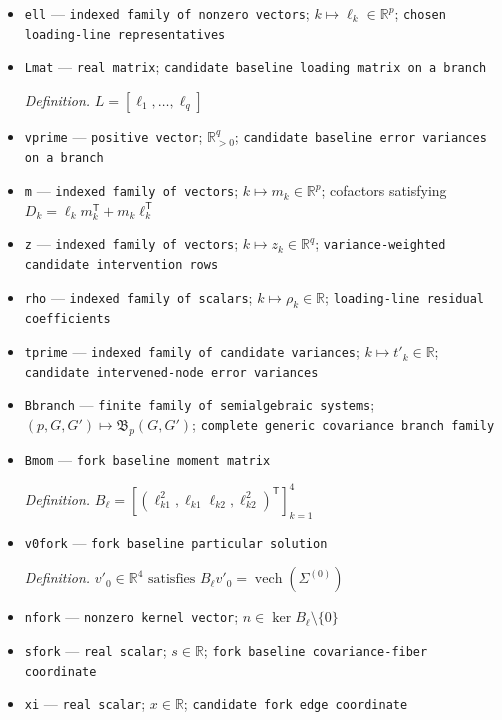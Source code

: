 \documentclass{article}
\begin{document}
\begin{itemize}
  \item \texttt{ell} --- \texttt{indexed family of nonzero vectors}; \(k\mapsto\ell_k\in\mathbb{R}^{p}\); \texttt{chosen loading-\allowbreak{}line representatives}
  \item \texttt{Lmat} --- \texttt{real matrix}; \texttt{candidate baseline loading matrix on a branch}
  \par\smallskip\noindent\emph{Definition.} \(L=[\ell_1,\ldots,\ell_q]\)
  \item \texttt{vprime} --- \texttt{positive vector}; \(\mathbb{R}_{>0}^{q}\); \texttt{candidate baseline error variances on a branch}
  \item \texttt{m} --- \texttt{indexed family of vectors}; \(k\mapsto m_k\in\mathbb{R}^{p}\); cofactors satisfying \(D_k=\ell_km_k^{\mathsf T}+m_k\ell_k^{\mathsf T}\)
  \item \texttt{z} --- \texttt{indexed family of vectors}; \(k\mapsto z_k\in\mathbb{R}^{q}\); \texttt{variance-\allowbreak{}weighted candidate intervention rows}
  \item \texttt{rho} --- \texttt{indexed family of scalars}; \(k\mapsto\rho_k\in\mathbb{R}\); \texttt{loading-\allowbreak{}line residual coefficients}
  \item \texttt{tprime} --- \texttt{indexed family of candidate variances}; \(k\mapsto t'_k\in\mathbb{R}\); \texttt{candidate intervened-\allowbreak{}node error variances}
  \item \texttt{Bbranch} --- \texttt{finite family of semialgebraic systems}; \((p,G,G')\mapsto\mathfrak B_p(G,G')\); \texttt{complete generic covariance branch family}
  \item \texttt{Bmom} --- \texttt{fork baseline moment matrix}
  \par\smallskip\noindent\emph{Definition.} \(B_{\ell}=[(\ell_{k1}^2,\ell_{k1}\ell_{k2},\ell_{k2}^2)^{\mathsf T}]_{k=1}^{4}\)
  \item \texttt{v0fork} --- \texttt{fork baseline particular solution}
  \par\smallskip\noindent\emph{Definition.} \(v'_0\in\mathbb R^4\text{ satisfies }B_{\ell}v'_0=\operatorname{vech}(\Sigma^{(0)})\)
  \item \texttt{nfork} --- \texttt{nonzero kernel vector}; \(n\in\ker B_{\ell}\setminus\{0\}\)
  \item \texttt{sfork} --- \texttt{real scalar}; \(s\in\mathbb R\); \texttt{fork baseline covariance-\allowbreak{}fiber coordinate}
  \item \texttt{xi} --- \texttt{real scalar}; \(x\in\mathbb R\); \texttt{candidate fork edge coordinate}

\end{itemize}
\end{document}

